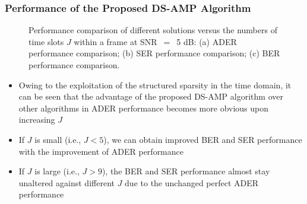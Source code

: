 \documentclass[9pt]{beamer}
\begin{document}
\begin{frame}
\frametitle{Performance of the Proposed DS-AMP Algorithm}
\begin{figure}[h]
\vspace{-8mm}
\centering
{}%
%
%
\centering
\setlength{\abovecaptionskip}{-1mm}
\caption{Performance comparison of different solutions versus the numbers of time slots $J$ within a frame at SNR~$=$~5 dB: (a) ADER performance comparison; (b) SER performance comparison; (c) BER performance comparison. }
\label{fig:SNR}
\vspace{-5mm}
\end{figure}
\begin{itemize}
\item
Owing to the exploitation of the structured sparsity in the time domain, it can be seen that the advantage of the proposed DS-AMP algorithm over other algorithms in ADER performance becomes more obvious upon increasing $J$
\item
If $J$ is small (i.e., $J<5$), we can obtain improved BER and SER performance with the improvement of ADER performance
\item
If $J$ is large (i.e., $J>9$), the BER and SER performance almost stay unaltered against different $J$ due to the unchanged perfect ADER performance
\end{itemize}
\end{frame}
\end{document}
